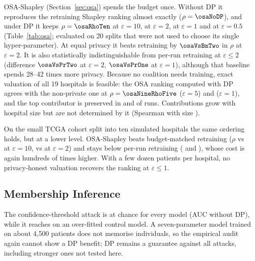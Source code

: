 OSA-Shapley (Section~\ref{sec:osa}) spends the budget once. Without DP it reproduces the retraining Shapley ranking almost exactly ($\rho=\osaNoDP$), and under DP it keeps $\rho=\osaRhoTen$ at $\varepsilon=10$, \osaRhoTwo{} at $\varepsilon=2$, \osaRhoOne{} at $\varepsilon=1$ and \osaRhoHalf{} at $\varepsilon=0.5$ (Table~\ref{tab:osa}; evaluated on 20 splits that were not used to choose its single hyper-parameter). At equal privacy it beats retraining by $\osaVsBmTwo$ in $\rho$ at $\varepsilon=2$. It is also statistically indistinguishable from per-run retraining at $\varepsilon \le 2$ (difference $\osaVsPrTwo$ at $\varepsilon=2$, $\osaVsPrOne$ at $\varepsilon=1$), although that baseline spends 28--42 times more privacy. Because no coalition needs training, exact valuation of all 19 hospitals is feasible: the OSA ranking computed with DP agrees with the non-private one at $\rho=\osaNineRhoFive$ ($\varepsilon=5$) and \osaNineRhoOne{} ($\varepsilon=1$), and the top contributor is preserved in \osaNineTSFive{} and \osaNineTSOne{} of runs. Contributions grow with hospital size but are not determined by it (Spearman with size \osaNineSize).

On the small TCGA cohort split into ten simulated hospitals the same ordering holds, but at a lower level. OSA-Shapley beats budget-matched retraining ($\rho$ \tOsaTen{} vs \tBmTen{} at $\varepsilon=10$, \tOsaTwo{} vs \tBmTwo{} at $\varepsilon=2$) and stays below per-run retraining (\tPrTen{} and \tPrTwo{}), whose cost is again hundreds of times higher. With a few dozen patients per hospital, no privacy-honest valuation recovers the ranking at $\varepsilon \le 1$.



\subsection{Membership Inference}
The confidence-threshold attack is at chance for every model (AUC \pMiaNoDP{} without DP), while it reaches \pMiaCtl{} on an over-fitted control model. A seven-parameter model trained on about 4{,}500 patients does not memorise individuals, so the empirical audit again cannot show a DP benefit; DP remains a guarantee against all attacks, including stronger ones not tested here.
